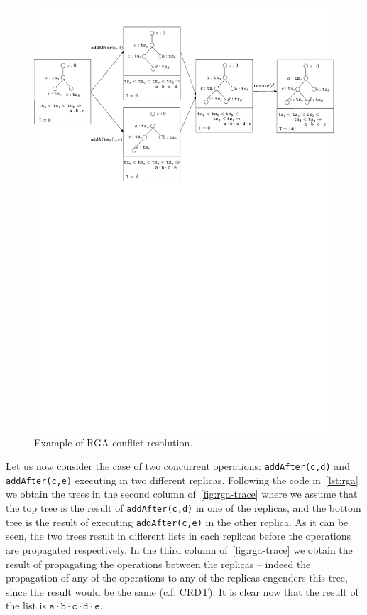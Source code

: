 \begin{figure}[t]
  \centering
  \includegraphics[width=1\textwidth]{figures/RGA-Trace}
  \caption{Example of RGA conflict resolution.}
  \label{fig:rga-trace}
\end{figure}

Let us now consider the case of two concurrent operations:
\lstinline|addAfter(c,d)| and \lstinline|addAfter(c,e)| executing in
two different replicas.
%
Following the code in~\autoref{lst:rga} we obtain the trees in the
second column of~\autoref{fig:rga-trace} where we assume that the
top tree is the result of \lstinline|addAfter(c,d)| in one of the
replicas, and the bottom tree is the result of executing
\lstinline|addAfter(c,e)| in the other replica.
%
As it can be seen, the two trees result in different lists in each
replicas before the operations are propagated respectively.
%
In the third column of~\autoref{fig:rga-trace} we obtain the
result of propagating the operations between the replicas -- indeed
the propagation of any of the operations to any of the replicas
engenders this tree, since the result would be the same (c.f. CRDT).
%
It is clear now that the result of the list is $\mathtt{a \cdot b
  \cdot c \cdot d \cdot e}$.


